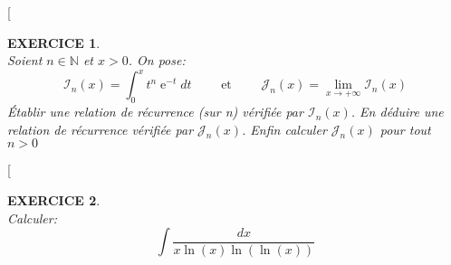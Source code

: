 \documentclass{article}%
\newtheorem{Exc}{EXERCICE}
\def\exo#1{%
  \futurelet\testchar\MaybeOptArgmyexoo}
\def\MaybeOptArgmyexoo{
  \ifx[\testchar \let\next\OptArgmyexoo
  \else \let\next\NoOptArgmyexoo \fi \next}
\def\OptArgmyexoo[#1]{%
  \begin{Exc}[#1]\normalfont}
\def\NoOptArgmyexoo{%
    \begin{Exc}\normalfont}
\newcommand{\finexo}{\end{Exc}}
\newif\ifprof
\DeclareMathOperator{\e}{e} %
\begin{document}
\exo{}
~\\
Soient $n \in \mathbb{N}$ et $x>0$. On pose:
\[
  \mathcal{I}_n(x) = \int_0^x t^n \e^{-t} dt \qquad  \text{ et } \qquad \mathcal{J}_n(x) = \lim
  \limits_{x \to +\infty} \mathcal{I}_n(x)
\]
Établir une relation de récurrence (sur n) vérifiée par $\mathcal{I}_n(x)$. En
déduire une relation de récurrence vérifiée par $\mathcal{J}_n(x)$. Enfin
calculer $\mathcal{J}_n(x)$ pour tout $n>0$
\ifprof\par
\emph{Corrigé}\par
\begin{correction}
  ~\\
  Ici on cherche une relation de réccurence sur n pour
  $\mathcal{I}_n = \int_0^x t^n \e^{-t} dt$. Pour cela il faudrait
  faire apparaitre le terme $t^{n-1}\e^{-t}$ dans l'intégrale
  $\mathcal{I}_n$ c'est à dire dérivée $t^n$. Nous avons une formule
  qui nous permet d'avoir une relation entre intégrale et dérivée qui
  est l'I.P.P. Essayons donc l'IPP en posant:
  \[
    u(t) = t^n \qquad \text{ et } \qquad v'(t) = \e^{-t}
  \]

  On a donc:
  \[
    u'(t) = n t^{n-1} \qquad \text{ et } \qquad v(t) = -\e^{-t}
  \]
  
  Ainsi en utilisant la formule d'IPP on a:
  \begin{eqnarray*} 
    \mathcal{I}_n(x) &=& \int_0^x t^n \e^{-t} dt \\
                  &=& \big[ -t^n \e^{-t} \big]_0^x - \int_0^x nt^{n-1}
                      \times (-e^{-t})dt \\
                  &=& x^n \e^{-x} + n \underbrace{\int_0^x t^{n-1}
                      e^{-t}dt}_{\mathcal{I}_{n-1}(x)}    \\
                  &=& x^n e^{-x} + n\mathcal{I}_{n-1}
  \end{eqnarray*}

  Maintenant, interessons nous à $\mathcal{J}_n(x) = \lim
  \limits_{x\to +\infty} \mathcal{I}_n(x) $
  \[
    \mathcal{J}_n(x) = \lim \limits_{x\to +\infty} \mathcal{I}_n(x)
    = \lim \limits_{x\to +\infty} (x^n e^{-x} + n\mathcal{I}_{n-1}(x))
    = \underbrace{\lim \limits_{x\to +\infty} x^n
      e^{-x}}_{\text{croissance comparée} = 0}
    + \underbrace{\lim \limits_{x\to +\infty}
      n\mathcal{I}_{n-1}(x)}_{n\mathcal{J}_{n-1}(x)}
    = n\mathcal{J}_{n-1}(x)
  \]

  On peut donc en déduire:
  \[
    \mathcal{J}_n(x) =  n \mathcal{J}_{n-1}(x)
    = n(n-1)\mathcal{J}_{n-2}(x)
    = \dots
    = n(n-1) \dots 2.1 \mathcal{J}_0(x)
    = n! ~\mathcal{J}_0(x)
  \]

  Or: $\mathcal{J}_0(x) = \lim \limits_{x \to +\infty} \int_0^x t^0
  e^{-t}dt = \lim \limits_{x \to +\infty} \int_0^x \e^{-t}dt = \lim
  \limits_{x \to +\infty} \big[ -e^{-t} \big]_0^x = \lim \limits_{x \to +\infty}
  -e^{-x} - (-e^0) = 0 + 1 = 1$

  \vspace{1\baselineskip}
  
  Finalement pour tout $n \geq 1 \quad \mathcal{J}_n(x) = n!$
\end{correction}
\fi
\finexo


\exo{}
~\\
Calculer: 
\[
  \int \frac{dx}{x \ln(x) \ln(\ln(x))} 
\]
\finexo

\newpage
\setcounter{page}{1}
\end{document}
